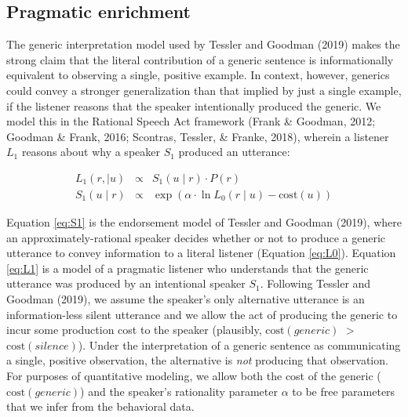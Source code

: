 \documentclass[floatsintext,doc]{apa6}
\begin{document}
\hypertarget{pragmatic-enrichment}{%
\subsection{Pragmatic enrichment}\label{pragmatic-enrichment}}

The generic interpretation model used by Tessler and Goodman (2019) makes the strong claim that the literal contribution of a generic sentence is informationally equivalent to observing a single, positive example.
In context, however, generics could convey a stronger generalization than that implied by just a single example, if the listener reasons that the speaker intentionally produced the generic.
We model this in the Rational Speech Act framework (Frank \& Goodman, 2012; Goodman \& Frank, 2016; Scontras, Tessler, \& Franke, 2018), wherein a listener \(L_1\) reasons about why a speaker \(S_1\) produced an utterance:

\begin{eqnarray}
L_1(r, \mid u) &\propto& S_1(u \mid r) \cdot P(r) \label{eq:L1}\\ 
S_1(u \mid r) &\propto& \exp{(\alpha \cdot \ln L_0(r \mid u) - \text{cost}(u))} \label{eq:S1}
\end{eqnarray}

Equation \ref{eq:S1} is the endorsement model of Tessler and Goodman (2019), where an approximately-rational speaker decides whether or not to produce a generic utterance to convey information to a literal listener (Equation \ref{eq:L0}).
Equation \ref{eq:L1} is a model of a pragmatic listener who understands that the generic utterance was produced by an intentional speaker \(S_1\).
Following Tessler and Goodman (2019), we assume the speaker's only alternative utterance is an information-less silent utterance and we allow the act of producing the generic to incur some production cost to the speaker (plausibly, \(\text{cost}(generic)\) \(>\) \(\text{cost}(silence)\)).
Under the interpretation of a generic sentence as communicating a single, positive observation, the alternative is \emph{not} producing that observation.
For purposes of quantitative modeling, we allow both the cost of the generic (\(\text{cost}(generic)\)) and the speaker's rationality parameter \(\alpha\) to be free parameters that we infer from the behavioral data.
\end{document}
